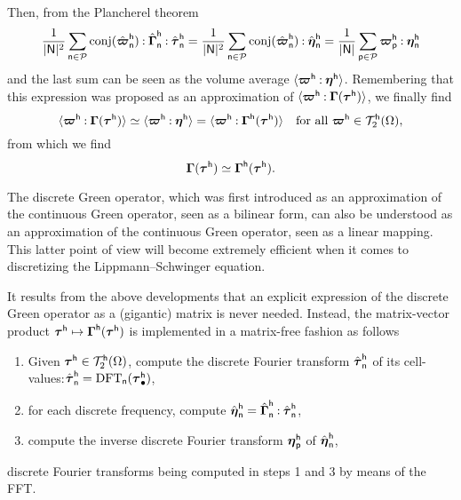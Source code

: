 Then, from the Plancherel theorem
\begin{equation}
  \frac1{\lvert\mathsf N\rvert^2}
  \sum_{\mathsf n\in\mathcal{P}}\operatorname{conj}(\hat{\boldsymbol\varpi}_{\mathsf n}^{\mathsf h})
  \mathbin{\mathord{:}}\hat{\boldsymbol\Gamma}_{\mathsf n}^{\mathsf h}\mathbin{\mathord{:}}
  \hat{\boldsymbol\tau}_{\mathsf n}^{\mathsf h}=\frac1{\lvert\mathsf N\rvert^2}
  \sum_{\mathsf n\in\mathcal{P}}\operatorname{conj}(\hat{\boldsymbol\varpi}_{\mathsf n}^{\mathsf h})
  \mathbin{\mathord{:}}\hat{\boldsymbol\eta}_{\mathsf n}^{\mathsf h}=\frac1{\lvert\mathsf N\rvert}
  \sum_{\mathsf p\in\mathcal{P}}\boldsymbol\varpi_{\mathsf p}^{\mathsf h}
  \mathbin{\mathord{:}}\boldsymbol\eta_{\mathsf n}^{\mathsf h}
\end{equation}
and the last sum can be seen as the volume average
\(\langle\boldsymbol\varpi^{\mathsf h}\mathbin{\mathord{:}}\boldsymbol\eta^{\mathsf h}\rangle\). Remembering
that this expression was proposed as an approximation of
\(\langle\boldsymbol\varpi^{\mathsf h}\mathbin{\mathord{:}}\boldsymbol\Gamma(\boldsymbol\tau^{\mathsf
  h})\rangle\), we finally find
\begin{equation}
  \langle\boldsymbol\varpi^{\mathsf h}\mathbin{\mathord{:}}\boldsymbol\Gamma(\boldsymbol\tau^{\mathsf h})\rangle
  \simeq\langle\boldsymbol\varpi^{\mathsf h}\mathbin{\mathord{:}}\boldsymbol\eta^{\mathsf h}\rangle
  =\langle\boldsymbol\varpi^{\mathsf h}\mathbin{\mathord{:}}\boldsymbol\Gamma^{\mathsf h}(\boldsymbol\tau^{\mathsf h})\rangle
  \quad\text{for all }\boldsymbol\varpi^{\mathsf h}\in\mathcal T_2^{\mathsf h}(\Omega),
\end{equation}
from which we find
\begin{equation}
  \boldsymbol\Gamma(\boldsymbol\tau^{\mathsf h})\simeq\boldsymbol\Gamma^{\mathsf h}
  (\boldsymbol\tau^{\mathsf h}).
\end{equation}

The discrete Green operator, which was first introduced as an approximation of
the continuous Green operator, seen as a bilinear form, can also be understood
as an approximation of the continuous Green operator, seen as a linear
mapping. This latter point of view will become extremely efficient when it comes
to discretizing the Lippmann–Schwinger equation.

It results from the above developments that an explicit expression of the
discrete Green operator as a (gigantic) matrix is never needed. Instead, the
matrix-vector product
\(\boldsymbol\tau^{\mathsf h}\mapsto\boldsymbol\Gamma^{\mathsf h}(\boldsymbol\tau^{\mathsf h})\) is
implemented in a matrix-free fashion as follows
\begin{enumerate}
\item Given \(\boldsymbol\tau^{\mathsf h}\in\mathcal T_2^{\mathsf h}(\Omega)\), compute
  the discrete Fourier transform \(\hat{\boldsymbol\tau}_{\mathsf n}^{\mathsf h}\) of
  its
  cell-values:\(\hat{\boldsymbol\tau}_{\mathsf n}^{\mathsf h}=\operatorname{DFT}_{\mathsf
    n}(\boldsymbol\tau_\bullet^{\mathsf h})\),
\item for each discrete frequency, compute
  \(\hat{\boldsymbol\eta}_{\mathsf n}^{\mathsf h}=\hat{\boldsymbol\Gamma}_{\mathsf n}^{\mathsf
    h}\mathbin{\mathord{:}}\hat{\boldsymbol\tau}_{\mathsf n}^{\mathsf h}\),
\item compute the inverse discrete Fourier transform
  \(\boldsymbol\eta_{\mathsf{p}}^{\mathsf h}\) of
  \(\hat{\boldsymbol\eta}_{\mathsf{n}}^{\mathsf h}\),
\end{enumerate}
discrete Fourier transforms being computed in steps 1 and 3 by means of the FFT.

